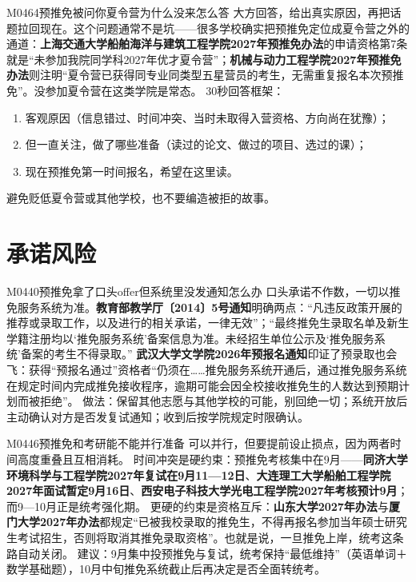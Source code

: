\begin{qa}{M0464}{预推免被问你夏令营为什么没来怎么答}
大方回答，给出真实原因，再把话题拉回现在。这个问题通常不是坑——很多学校确实把预推免定位成夏令营之外的通道：\textbf{上海交通大学船舶海洋与建筑工程学院2027年预推免办法}的申请资格第7条就是“未参加我院同学科2027年优才夏令营”；\textbf{机械与动力工程学院2027年预推免办法}则注明“夏令营已获得同专业同类型五星营员的考生，无需重复报名本次预推免”。没参加夏令营在这类学院是常态。
30秒回答框架：
\begin{enumerate}
  \item 客观原因（信息错过、时间冲突、当时未取得入营资格、方向尚在犹豫）；
  \item 但一直关注，做了哪些准备（读过的论文、做过的项目、选过的课）；
  \item 现在预推免第一时间报名，希望在这里读。
\end{enumerate}
避免贬低夏令营或其他学校，也不要编造被拒的故事。
\end{qa}

\section{承诺风险}
\begin{qa}{M0440}{预推免拿了口头offer但系统里没发通知怎么办}
口头承诺不作数，一切以推免服务系统为准。\textbf{教育部教学厅〔2014〕5号通知}明确两点：“凡违反政策开展的推荐或录取工作，以及进行的相关承诺，一律无效”；“最终推免生录取名单及新生学籍注册均以‘推免服务系统’备案信息为准。未经招生单位公示及‘推免服务系统’备案的考生不得录取。”
\textbf{武汉大学文学院2026年预报名通知}印证了预录取也会飞：获得“预报名通过”资格者“仍须在……推免服务系统开通后，通过推免服务系统在规定时间内完成推免接收程序，逾期可能会因全校接收推免生的人数达到预期计划而被拒绝”。
做法：保留其他志愿与其他学校的可能，别回绝一切；系统开放后主动确认对方是否发复试通知；收到后按学院规定时限确认。
\end{qa}

\begin{qa}{M0446}{预推免和考研能不能并行准备}
可以并行，但要提前设止损点，因为两者时间高度重叠且互相消耗。
时间冲突是硬约束：预推免考核集中在9月——\textbf{同济大学环境科学与工程学院2027年复试在9月11—12日}、\textbf{大连理工大学船舶工程学院2027年面试暂定9月16日}、\textbf{西安电子科技大学光电工程学院2027年考核预计9月}；而9—10月正是统考强化期。
更硬的约束是资格互斥：\textbf{山东大学2027年办法}与\textbf{厦门大学2027年办法}都规定“已被我校录取的推免生，不得再报名参加当年硕士研究生考试招生，否则将取消其推免录取资格”。也就是说，一旦推免上岸，统考这条路自动关闭。
建议：9月集中投预推免与复试，统考保持“最低维持”（英语单词＋数学基础题），10月中旬推免系统截止后再决定是否全面转统考。
\end{qa}

